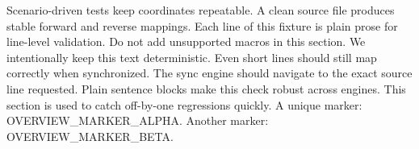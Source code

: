 Scenario-driven tests keep coordinates repeatable.
A clean source file produces stable forward and reverse mappings.
Each line of this fixture is plain prose for line-level validation.
Do not add unsupported macros in this section.
We intentionally keep this text deterministic.
Even short lines should still map correctly when synchronized.
The sync engine should navigate to the exact source line requested.
Plain sentence blocks make this check robust across engines.
This section is used to catch off-by-one regressions quickly.
A unique marker: OVERVIEW\_MARKER\_ALPHA.
Another marker: OVERVIEW\_MARKER\_BETA.
